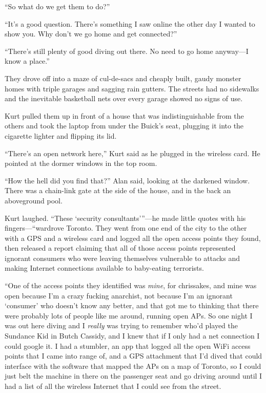 ``So what do we get them to do?''

``It's a good question.  There's something I saw online the other day
I wanted to show you.  Why don't we go home and get connected?''

``There's still plenty of good diving out there.  No need to go home
anyway---I know a place.''

They drove off into a maze of cul-de-sacs and cheaply built, gaudy
monster homes with triple garages and sagging rain gutters.  The
streets had no sidewalks and the inevitable basketball nets over every
garage showed no signs of use.

Kurt pulled them up in front of a house that was indistinguishable
from the others and took the laptop from under the Buick's seat,
plugging it into the cigarette lighter and flipping its lid.

``There's an open network here,'' Kurt said as he plugged in the
wireless card.  He pointed at the dormer windows in the top room.

``How the hell did you find that?'' Alan said, looking at the darkened
window.  There was a chain-link gate at the side of the house, and in
the back an aboveground pool.

Kurt laughed.  ``These `security consultants'''---he made little quotes
with his fingers---``wardrove Toronto.  They went from one end of the
city to the other with a GPS and a wireless card and logged all the
open access points they found, then released a report claiming that
all of those access points represented ignorant consumers who were
leaving themselves vulnerable to attacks and making Internet
connections available to baby-eating terrorists.

``One of the access points they identified was \textit{mine}, for
chrissakes, and mine was open because I'm a crazy fucking anarchist,
not because I'm an ignorant `consumer' who doesn't know any better,
and that got me to thinking that there were probably lots of people
like me around, running open APs.  So one night I was out here diving
and I \textit{really} was trying to remember who'd played the Sundance
Kid in Butch Cassidy, and I knew that if I only had a net connection I
could google it.  I had a stumbler, an app that logged all the open
WiFi access points that I came into range of, and a GPS attachment
that I'd dived that could interface with the software that mapped the
APs on a map of Toronto, so I could just belt the machine in there on
the passenger seat and go driving around until I had a list of all the
wireless Internet that I could see from the street.

